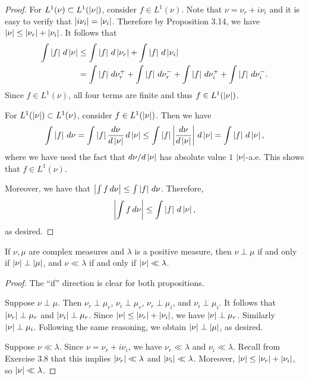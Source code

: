 \documentclass[a4paper]{article}
\begin{document}
\begin{proof}
For $L^1 (\nu) \subset L^1 (\left\lvert \nu\right\rvert)$, consider $f \in L^1 (\nu)$.
Note that $\nu = \nu_r + i \nu_i$ and it is easy to 
verify that $\left\lvert i \nu_i\right\rvert = \left\lvert \nu_i\right\rvert$.
Therefore by Proposition 3.14, we have $\left\lvert \nu\right\rvert \leq 
\left\lvert \nu_r\right\rvert + \left\lvert \nu_i\right\rvert$. It follows that 
\[
\begin{aligned}
\int \left\lvert f\right\rvert \, d \left\lvert \nu\right\rvert 
&\leq \int \left\lvert f\right\rvert \, d \left\lvert \nu_r\right\rvert + \int \left\lvert f\right\rvert \, d
\left\lvert \nu_i\right\rvert \\
&= \int \left\lvert f\right\rvert \, d \nu_r^+ + \int \left\lvert f\right\rvert \, d \nu_r^- 
+ \int \left\lvert f\right\rvert \, d \nu_i^+ + \int \left\lvert f\right\rvert \, d \nu_i^-.
\end{aligned}
\]
Since $f \in L^1 (\nu)$, all four terms are finite and thus 
$f \in L^1 (\left\lvert \nu\right\rvert)$. 

For $L^1 (\left\lvert \nu\right\rvert) \subset L^1 (\nu)$, consider $f \in L^1 
(\left\lvert \nu\right\rvert)$. Then we have 
\[
\int \left\lvert f\right\rvert \, d \nu 
= \int \left\lvert f\right\rvert \frac{d \nu}{d \left\lvert \nu\right\rvert} \, d \left\lvert \nu\right\rvert 
\leq \int \left\lvert f\right\rvert \left\lvert \frac{d \nu}{d \left\lvert \nu\right\rvert}\right\rvert \, d \left\lvert \nu\right\rvert 
= \int \left\lvert f\right\rvert \, d \left\lvert \nu\right\rvert,
\]
where we have used the fact that $d \nu / d \left\lvert \nu\right\rvert$ has 
absolute value $1$ $\left\lvert \nu\right\rvert$-a.e. This shows that 
$f \in L^1 (\nu)$. 

Moreover, we have that $\left\lvert \int f \, d \nu\right\rvert 
\leq \int \left\lvert f\right\rvert \, d \nu$. Therefore,
\[
\left\lvert \int f \, d \nu\right\rvert \leq \int \left\lvert f\right\rvert \, d \left\lvert \nu\right\rvert,
\]
as desired.
\end{proof}

\begin{ex}[Folland 3.19]
If $\nu, \mu$ are complex measures and $\lambda$ 
is a positive measure, then $\nu \perp \mu$ if and only 
if $\left\lvert \nu\right\rvert \perp \left\lvert \mu\right\rvert$, and $\nu \ll \lambda$ 
if and only if $\left\lvert \nu\right\rvert \ll \lambda$.
\end{ex}

\begin{proof}
The ``if'' direction is clear for both propositions.

Suppose $\nu \perp \mu$. Then $\nu_r \perp \mu_r$,
$\nu_i \perp \mu_r$, $\nu_r \perp \mu_i$, and $\nu_i \perp \mu_i$.
It follows that $\left\lvert \nu_r\right\rvert \perp \mu_r$ and $\left\lvert \nu_i\right\rvert
\perp \mu_r$. Since $\left\lvert \nu\right\rvert \leq \left\lvert \nu_r\right\rvert + \left\lvert \nu_i\right\rvert$, 
we have $\left\lvert \nu\right\rvert \perp \mu_r$. Similarly $\left\lvert \nu\right\rvert \perp \mu_i$.
Following the same reasoning, we obtain 
$\left\lvert \nu\right\rvert \perp \left\lvert \mu\right\rvert$, as desired.

Suppose $\nu \ll \lambda$. 
Since $\nu = \nu_r + i \nu_i$, we have 
$\nu_r \ll \lambda$ and $\nu_i \ll \lambda$. 
Recall from Exercise 3.8 that this implies $\left\lvert \nu_r\right\rvert \ll 
\lambda$ and $\left\lvert \nu_i\right\rvert \ll \lambda$. Moreover, 
$\left\lvert \nu\right\rvert \leq \left\lvert \nu_r\right\rvert + \left\lvert \nu_i\right\rvert$, so 
$\left\lvert \nu\right\rvert \ll \lambda$.
\end{proof}
\end{document}
